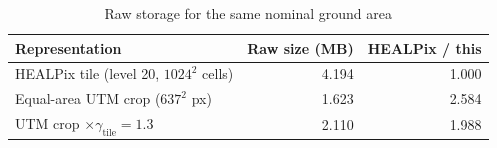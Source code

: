 \begin{table}[t]
\centering
\caption{Raw storage for the same nominal ground area}
\label{tab:storage_accounting}
\footnotesize
\setlength{\tabcolsep}{3pt}
\begin{tabular}{lrr}
\toprule
Representation & Raw size (MB) & HEALPix / this \\
\midrule
HEALPix tile (level 20, $1024^2$ cells) & 4.194 & 1.000 \\
Equal-area UTM crop ($637^2$ px) & 1.623 & 2.584 \\
UTM crop $\times\gamma_{\mathrm{tile}}=1.3$ & 2.110 & 1.988 \\
\bottomrule
\end{tabular}
\end{table}
